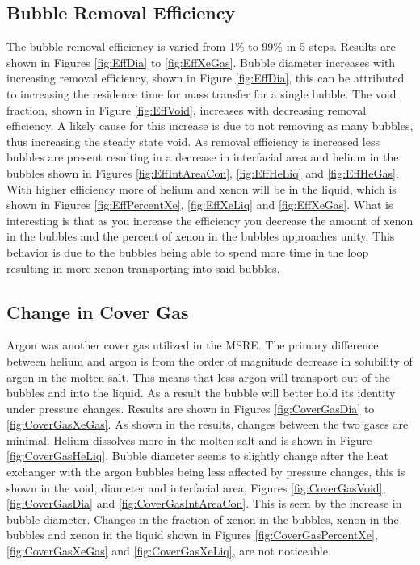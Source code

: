 \subsection{Bubble Removal Efficiency}
The bubble removal efficiency is varied from 1\% to 99\% in 5 steps. Results are shown in Figures \ref{fig:EffDia} to \ref{fig:EffXeGas}. Bubble diameter increases with increasing removal efficiency, shown in Figure \ref{fig:EffDia}, this can be attributed to increasing the residence time for mass transfer for a single bubble. The void fraction, shown in Figure \ref{fig:EffVoid}, increases with decreasing removal efficiency. A likely cause for this increase is due to not removing as many bubbles, thus increasing the steady state void. As removal efficiency is increased less bubbles are present resulting in a decrease in interfacial area and helium in the bubbles shown in Figures \ref{fig:EffIntAreaCon}, \ref{fig:EffHeLiq} and \ref{fig:EffHeGas}. With higher efficiency more of helium and xenon will be in the liquid, which is shown in Figures \ref{fig:EffPercentXe}, \ref{fig:EffXeLiq} and \ref{fig:EffXeGas}. What is interesting is that as you increase the efficiency you decrease the amount of xenon in the bubbles and the percent of xenon in the bubbles approaches unity. This behavior is due to the bubbles being able to spend more time in the loop resulting in more xenon transporting into said bubbles. 

\subsection{Change in Cover Gas}
Argon was another cover gas utilized in the MSRE. The primary difference between helium and argon is from the order of magnitude decrease in solubility of argon in the molten salt. This means that less argon will transport out of the bubbles and into the liquid. As a result the bubble will better hold its identity under pressure changes. Results are shown in Figures \ref{fig:CoverGasDia} to \ref{fig:CoverGasXeGas}. As shown in the results, changes between the two gases are minimal. Helium dissolves more in the molten salt and is shown in Figure \ref{fig:CoverGasHeLiq}. Bubble diameter seems to slightly change after the heat exchanger with the argon bubbles being less affected by pressure changes, this is shown in the void, diameter and interfacial area, Figures \ref{fig:CoverGasVoid}, \ref{fig:CoverGasDia} and \ref{fig:CoverGasIntAreaCon}. This is seen by the increase in bubble diameter. Changes in the fraction of xenon in the bubbles, xenon in the bubbles and xenon in the liquid shown in Figures \ref{fig:CoverGasPercentXe}, \ref{fig:CoverGasXeGas} and \ref{fig:CoverGasXeLiq}, are not noticeable. 

